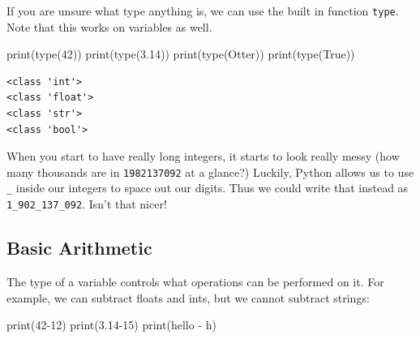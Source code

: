 \documentclass[
  letterpaper,
  DIV=11,
  numbers=noendperiod]{scrreprt}
\newenvironment{Shaded}{\begin{snugshade}}{\end{snugshade}}
\newcommand{\BuiltInTok}[1]{\textcolor[rgb]{0.00,0.23,0.31}{#1}}
\newcommand{\DecValTok}[1]{\textcolor[rgb]{0.68,0.00,0.00}{#1}}
\newcommand{\FloatTok}[1]{\textcolor[rgb]{0.68,0.00,0.00}{#1}}
\newcommand{\NormalTok}[1]{\textcolor[rgb]{0.00,0.23,0.31}{#1}}
\newcommand{\OperatorTok}[1]{\textcolor[rgb]{0.37,0.37,0.37}{#1}}
\newcommand{\StringTok}[1]{\textcolor[rgb]{0.13,0.47,0.30}{#1}}
\newcommand{\VariableTok}[1]{\textcolor[rgb]{0.07,0.07,0.07}{#1}}
\begin{document}
If you are unsure what type anything is, we can use the built in
function \texttt{type}. Note that this works on variables as well.

\begin{Shaded}
\begin{Highlighting}[]
\BuiltInTok{print}\NormalTok{(}\BuiltInTok{type}\NormalTok{(}\DecValTok{42}\NormalTok{))}
\BuiltInTok{print}\NormalTok{(}\BuiltInTok{type}\NormalTok{(}\FloatTok{3.14}\NormalTok{))}
\BuiltInTok{print}\NormalTok{(}\BuiltInTok{type}\NormalTok{(}\StringTok{\textquotesingle{}Otter\textquotesingle{}}\NormalTok{))}
\BuiltInTok{print}\NormalTok{(}\BuiltInTok{type}\NormalTok{(}\VariableTok{True}\NormalTok{))}
\end{Highlighting}
\end{Shaded}

\begin{verbatim}
<class 'int'>
<class 'float'>
<class 'str'>
<class 'bool'>
\end{verbatim}

\begin{tcolorbox}[enhanced jigsaw, rightrule=.15mm, opacitybacktitle=0.6, colback=white, toprule=.15mm, colframe=quarto-callout-tip-color-frame, bottomtitle=1mm, bottomrule=.15mm, arc=.35mm, coltitle=black, breakable, title=\textcolor{quarto-callout-tip-color}{\faLightbulb}\hspace{0.5em}{Messy Numbers}, titlerule=0mm, opacityback=0, colbacktitle=quarto-callout-tip-color!10!white, left=2mm, toptitle=1mm, leftrule=.75mm]
When you start to have really long integers, it starts to look really
messy (how many thousands are in \texttt{1982137092} at a glance?)
Luckily, Python allows us to use \texttt{\_} inside our integers to
space out our digits. Thus we could write that instead as
\texttt{1\_902\_137\_092}. Isn't that nicer!
\end{tcolorbox}

\hypertarget{basic-arithmetic}{%
\subsection{Basic Arithmetic}\label{basic-arithmetic}}

The type of a variable controls what operations can be performed on it.
For example, we can subtract floats and ints, but we cannot subtract
strings:

\begin{Shaded}
\begin{Highlighting}[]
\BuiltInTok{print}\NormalTok{(}\DecValTok{42}\OperatorTok{{-}}\DecValTok{12}\NormalTok{)}
\BuiltInTok{print}\NormalTok{(}\FloatTok{3.14}\OperatorTok{{-}}\DecValTok{15}\NormalTok{)}
\BuiltInTok{print}\NormalTok{(}\StringTok{\textquotesingle{}hello\textquotesingle{}} \OperatorTok{{-}} \StringTok{\textquotesingle{}h\textquotesingle{}}\NormalTok{)}
\end{Highlighting}
\end{Shaded}
\end{document}
